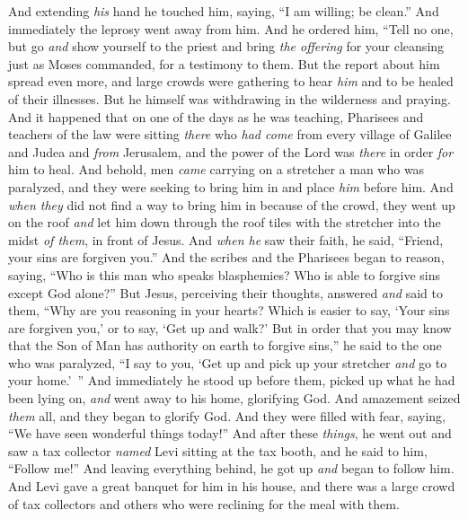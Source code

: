 \begin{biblechapter}
\verse And extending \textit{his} hand he touched him, saying, “I am willing; be clean.” And immediately the leprosy went away from him.
\verse And he ordered him, “Tell no one, but go \textit{and} show yourself to the priest and bring \textit{the offering} for your cleansing just as Moses commanded, for a testimony to them.
\verse But the report about him spread even more, and large crowds were gathering to hear \textit{him} and to be healed of their illnesses.
\verse But he himself was withdrawing in the wilderness and praying.
 And it happened that on one of the days as he was teaching, Pharisees and teachers of the law were sitting \textit{there} who \textit{had come} from every village of Galilee and Judea and \textit{from} Jerusalem, and the power of the Lord was \textit{there} in order \textit{for} him to heal.
\verse And behold, men \textit{came} carrying on a stretcher a man who was paralyzed, and they were seeking to bring him in and place \textit{him}﻿ before him.
\verse And \textit{when they} did not find a way to bring him in because of the crowd, they went up on the roof \textit{and} let him down through the roof tiles with the stretcher into the midst \textit{of them}, in front of Jesus.
\verse And \textit{when he} saw their faith, he said, “Friend, your sins are forgiven you.”
\verse And the scribes and the Pharisees began to reason, saying, “Who is this man who speaks blasphemies? Who is able to forgive sins except God alone?”
\verse But Jesus, perceiving their thoughts, answered \textit{and} said to them, “Why are you reasoning in your hearts?
\verse Which is easier to say, ‘Your sins are forgiven you,’ or to say, ‘Get up and walk?’
\verse But in order that you may know that the Son of Man has authority on earth to forgive sins,” he said to the one who was paralyzed, “I say to you, ‘Get up and pick up your stretcher \textit{and} go to your home.’ ”
\verse And immediately he stood up before them, picked up what he had been lying on, \textit{and} went away to his home, glorifying God.
\verse And amazement seized \textit{them} all, and they began to glorify God. And they were filled with fear, saying, “We have seen wonderful things today!”
 And after these \textit{things}, he went out and saw a tax collector \textit{named} Levi sitting at the tax booth, and he said to him, “Follow me!”
\verse And leaving everything behind, he got up \textit{and} began to follow him.
\verse And Levi gave a great banquet for him in his house, and there was a large crowd of tax collectors and others who were reclining for the meal with them.

\end{biblechapter}
